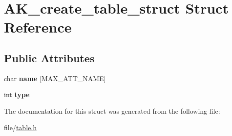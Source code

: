 \hypertarget{structAK__create__table__struct}{\section{A\+K\+\_\+create\+\_\+table\+\_\+struct Struct Reference}
\label{structAK__create__table__struct}
}
\subsection*{Public Attributes}
\begin{DoxyCompactItemize}
\item 
\hypertarget{structAK__create__table__struct_a22326c60182d352e7970c404a4771181}{char {\bfseries name} \mbox{[}M\+A\+X\+\_\+\+A\+T\+T\+\_\+\+N\+A\+M\+E\mbox{]}}\label{structAK__create__table__struct_a22326c60182d352e7970c404a4771181}

\item 
\hypertarget{structAK__create__table__struct_aa252469c3f2dbd3585f6a14b862b72f7}{int {\bfseries type}}\label{structAK__create__table__struct_aa252469c3f2dbd3585f6a14b862b72f7}

\end{DoxyCompactItemize}


The documentation for this struct was generated from the following file\+:\begin{DoxyCompactItemize}
\item 
file/\hyperlink{table_8h}{table.\+h}\end{DoxyCompactItemize}
